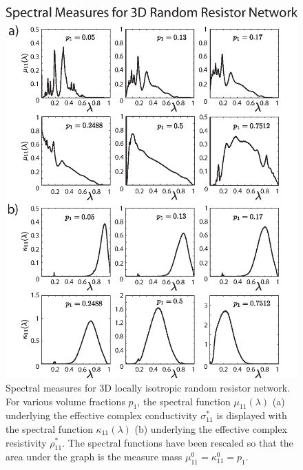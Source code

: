 \documentclass{cmslatex}
\begin{document}
%
\begin{figure}[t]
  \centerline{\includegraphics[scale=0.8]{3D_Spectral_Measures_Gamma_GammaCurl.eps}} 
\caption{Spectral measures for 3D locally isotropic random resistor
  network. For various volume fractions $p_1$, the spectral function
  $\mu_{11}(\lambda)$ (a) underlying the effective complex conductivity
  $\sigma^*_{11}$ is displayed with the spectral function $\kappa_{11}(\lambda)$ (b)  
  underlying the effective complex resistivity $\rho^*_{11}$. The
  spectral functions have been rescaled so that the area under the
  graph is the measure mass $\mu^0_{11}=\kappa^0_{11}=p_1$.                
        }
\label{fig:3D_Spectral_Measures}
\end{figure}
%
\end{document}
